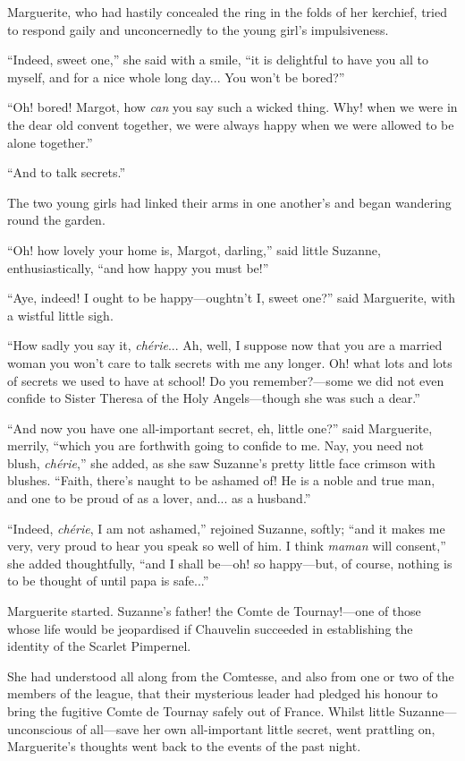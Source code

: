 \documentclass[paper=5.5in:8.5in,BCOR=7mm,twoside,DIV=calc,12pt,usegeometry,chapterprefix,endperiod,headings=big]{scrbook}
\begin{document}
Marguerite, who had hastily concealed the ring in the folds of her kerchief, tried to respond gaily and unconcernedly to the young girl's impulsiveness.

\enquote{Indeed, sweet one,} she said with a smile, \enquote{it is delightful to have you all to myself, and for a nice whole long day... You won't be bored?}

\enquote{Oh! bored! Margot, how \textit{can} you say such a wicked thing. Why! when we were in the dear old convent together, we were always happy when we were allowed to be alone together.}

\enquote{And to talk secrets.}

The two young girls had linked their arms in one another's and began wandering round the garden.

\enquote{Oh! how lovely your home is, Margot, darling,} said little Suzanne, enthusiastically, \enquote{and how happy you must be!}

\enquote{Aye, indeed! I ought to be happy---oughtn't I, sweet one?} said Marguerite, with a wistful little sigh.

\enquote{How sadly you say it, \textit{chérie}... Ah, well, I suppose now that you are a married woman you won't care to talk secrets with me any longer. Oh! what lots and lots of secrets we used to have at school! Do you remember?---some we did not even confide to Sister Theresa of the Holy Angels---though she was such a dear.}

\enquote{And now you have one all-important secret, eh, little one?} said Marguerite, merrily, \enquote{which you are forthwith going to confide to me. Nay, you need not blush, \textit{chérie},} she added, as she saw Suzanne's pretty little face crimson with blushes. \enquote{Faith, there's naught to be ashamed of! He is a noble and true man, and one to be proud of as a lover, and... as a husband.}

\enquote{Indeed, \textit{chérie}, I am not ashamed,} rejoined Suzanne, softly; \enquote{and it makes me very, very proud to hear you speak so well of him. I think \textit{maman} will consent,} she added thoughtfully, \enquote{and I shall be---oh! so happy---but, of course, nothing is to be thought of until papa is safe...}

Marguerite started. Suzanne's father! the Comte de Tournay!---one of those whose life would be jeopardised if Chauvelin succeeded in establishing the identity of the Scarlet Pimpernel.

She had understood all along from the Comtesse, and also from one or two of the members of the league, that their mysterious leader had pledged his honour to bring the fugitive Comte de Tournay safely out of France. Whilst little Suzanne---unconscious of all---save her own \newline all-important little secret, went prattling on, Marguerite's thoughts went back to the events of the past night.
\end{document}
